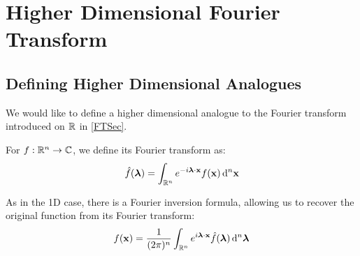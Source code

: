 \documentclass[../main.tex]{subfiles}
\begin{document}
\section{Higher Dimensional Fourier Transform}
\subsection{Defining Higher Dimensional Analogues}
We would like to define a higher dimensional analogue to the Fourier transform introduced on $\mathbb{R}$ in \cref{FTSec}.
\begin{definition}
  For $f: \mathbb{R}^{n} \to \mathbb{C}$, we define its Fourier transform as:
  \[
    \hat{f}(\vec{\lambda}) = \int_{\R^{n}} e^{-i \vec{\lambda} \cdot \vec{x}} f(\vec{x}) \d^{n}{\vec{x}}
  \]
\end{definition}
As in the 1D case, there is a Fourier inversion formula, allowing us to recover the original function from its Fourier transform:
\[
  f(\vec{x}) = \frac{1}{(2\pi)^{n}} \int_{\R^{n}} e^{i \vec{\lambda} \cdot \vec{x}} \hat{f}(\vec{\lambda}) \d^{n}{\vec{\lambda}}
\]
\end{document}
